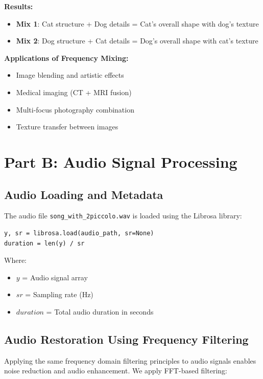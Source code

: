 \documentclass[12pt,a4paper]{article}
\begin{document}
\bigskip
\textbf{Results:}
\begin{itemize}
    \item \textbf{Mix 1}: Cat structure + Dog details = Cat's overall shape with dog's texture
    \item \textbf{Mix 2}: Dog structure + Cat details = Dog's overall shape with cat's texture
\end{itemize}

\bigskip
\textbf{Applications of Frequency Mixing:}
\begin{itemize}
    \item Image blending and artistic effects
    \item Medical imaging (CT + MRI fusion)
    \item Multi-focus photography combination
    \item Texture transfer between images
\end{itemize}

\bigskip
\section{Part B: Audio Signal Processing}

\subsection{Audio Loading and Metadata}
The audio file \texttt{song\_with\_2piccolo.wav} is loaded using the Librosa library:

\bigskip
\begin{verbatim}
y, sr = librosa.load(audio_path, sr=None)
duration = len(y) / sr
\end{verbatim}

\bigskip
Where:
\begin{itemize}
    \item $y$ = Audio signal array
    \item $sr$ = Sampling rate (Hz)
    \item $duration$ = Total audio duration in seconds
\end{itemize}

\bigskip
\subsection{Audio Restoration Using Frequency Filtering}
Applying the same frequency domain filtering principles to audio signals enables noise reduction and audio enhancement. We apply FFT-based filtering:
\end{document}
